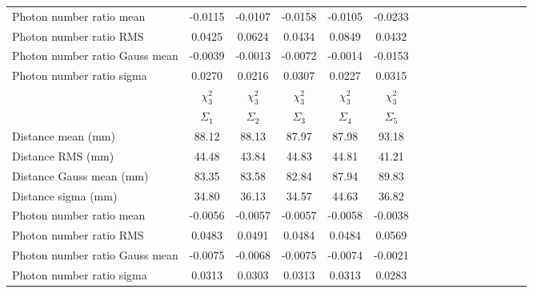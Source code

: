 \begin{table}
\begin{tabular}{lccccccccccccccc}
Photon number ratio mean       &-0.0115 &-0.0107 &-0.0158 &-0.0105 &-0.0233 \\
Photon number ratio RMS        &0.0425  &0.0624  &0.0434  &0.0849  &0.0432  \\
Photon number ratio Gauss mean &-0.0039 &-0.0013 &-0.0072 &-0.0014 &-0.0153 \\
Photon number ratio sigma      &0.0270  &0.0216  &0.0307  &0.0227  &0.0315  \\
\hline
\hline
 & $\chi^2_3$ & $\chi^2_3$ & $\chi^2_3$ & $\chi^2_3$ & $\chi^2_3$ \\ 
 & $\Sigma_1$ & $\Sigma_2$ & $\Sigma_3$ & $\Sigma_4$ & $\Sigma_5$ \\
\hline
Distance mean (mm)             &88.12   &88.13   &87.97   &87.98   &93.18\\
Distance RMS (mm)              &44.48   &43.84   &44.83   &44.81   &41.21\\
Distance Gauss mean (mm)       &83.35   &83.58   &82.84   &87.94   &89.83\\
Distance sigma (mm)            &34.80   &36.13   &34.57   &44.63   &36.82\\
Photon number ratio mean       &-0.0056 &-0.0057 &-0.0057 &-0.0058 &-0.0038\\
Photon number ratio RMS        &0.0483  &0.0491  &0.0484  &0.0484  &0.0569\\
Photon number ratio Gauss mean &-0.0075 &-0.0068 &-0.0075 &-0.0074 &-0.0021\\
Photon number ratio sigma      &0.0313  &0.0303  &0.0313  &0.0313  &0.0283\\
\hline
\end{tabular}
\end{table}


%
%
%
%
%


